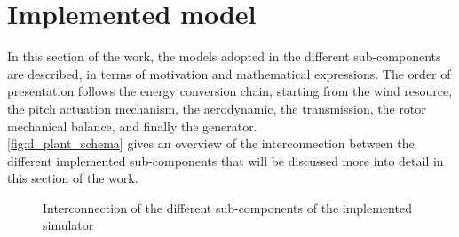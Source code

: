 \newpage
\section{Implemented model}\label{sec:c_basic_model_model}
In this section of the work, the models adopted in the different sub-components are described, in terms of motivation and mathematical expressions. The order of presentation follows the energy conversion chain, starting from the wind resource, the pitch actuation mechanism, the aerodynamic, the transmission, the rotor mechanical balance, and finally the generator. \\
\autoref{fig:d_plant_schema} gives an overview of the interconnection between the different implemented sub-components that will be discussed more into detail in this section of the work.
\begin{figure}[htb]
  \centering
  
  \caption{Interconnection of the different sub-components of the implemented simulator}
  \label{fig:d_plant_schema}
\end{figure}


